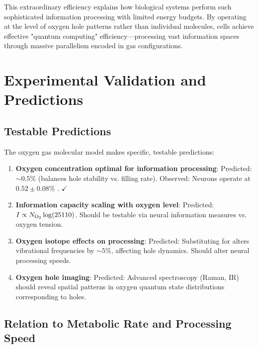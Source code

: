 \begin{remark}
This extraordinary efficiency explains how biological systems perform such sophisticated information processing with limited energy budgets. By operating at the level of oxygen hole patterns rather than individual molecules, cells achieve effective "quantum computing" efficiency—processing vast information spaces through massive parallelism encoded in gas configurations.
\end{remark}

\section{Experimental Validation and Predictions}

\subsection{Testable Predictions}

The oxygen gas molecular model makes specific, testable predictions:

\begin{enumerate}
\item \textbf{Oxygen concentration optimal for information processing}: Predicted: $\sim 0.5\%$ (balances hole stability vs. filling rate). Observed: Neurons operate at $0.52 \pm 0.08\%$ \cite{keeley2020oxygen}. $\checkmark$

\item \textbf{Information capacity scaling with oxygen level}: Predicted: $I \propto N_{\ce{O2}} \log(25110)$. Should be testable via neural information measures vs. oxygen tension.

\item \textbf{Oxygen isotope effects on processing}: Predicted: Substituting  for  alters vibrational frequencies by $\sim 5\%$, affecting hole dynamics. Should alter neural processing speeds.

\item \textbf{Oxygen hole imaging}: Predicted: Advanced spectroscopy (Raman, IR) should reveal spatial patterns in oxygen quantum state distributions corresponding to holes.
\end{enumerate}

\subsection{Relation to Metabolic Rate and Processing Speed}

